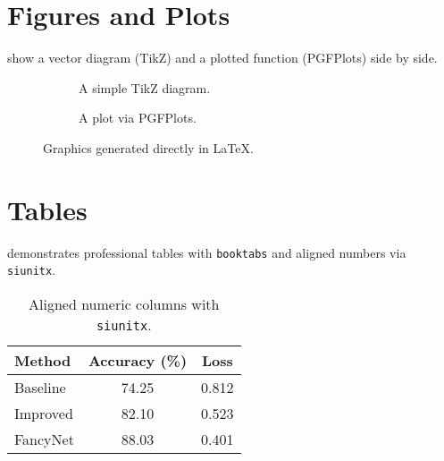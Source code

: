 \documentclass[11pt]{article}
\newcommand{\vect}[1]{\boldsymbol{#1}}
\begin{document}
\section{Figures and Plots}
 show a vector diagram (TikZ) and a plotted function (PGFPlots) side by side.
\begin{figure}[h]
  \centering
  \begin{subfigure}{.48\textwidth}
    \centering
    \caption{A simple TikZ diagram.}
    \label{fig:diagram}
  \end{subfigure}\hfill
  \begin{subfigure}{.48\textwidth}
    \centering
    \caption{A plot via PGFPlots.}
    \label{fig:plot}
  \end{subfigure}
  \caption{Graphics generated directly in \LaTeX{}.}
\end{figure}

\section{Tables}
 demonstrates professional tables with \texttt{booktabs} and aligned numbers via \texttt{siunitx}.
\begin{table}[h]
  \centering
  \begin{tabular}{l S[table-format=2.2] S[table-format=1.3]}
    \toprule
    Method & {Accuracy (\%)} & {Loss} \\
    \midrule
    Baseline & 74.25 & 0.812 \\
    Improved & 82.10 & 0.523 \\
    FancyNet & 88.03 & 0.401 \\
    \bottomrule
  \end{tabular}
  \caption{Aligned numeric columns with \texttt{siunitx}.}
  \label{tab:results}
\end{table}
\end{document}
